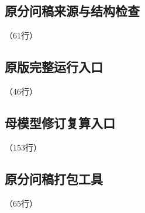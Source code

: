 
\label{code:source:31:end}


\subsection{原分问稿来源与结构检查}

\label{code:source:32}

{\small\noindent{}\quad（61行）\par}


\label{code:source:32:end}


\subsection{原版完整运行入口}

\label{code:source:33}

{\small\noindent{}\quad（46行）\par}


\label{code:source:33:end}


\subsection{母模型修订复算入口}

\label{code:source:34}

{\small\noindent{}\quad（153行）\par}


\label{code:source:34:end}


\subsection{原分问稿打包工具}

\label{code:source:35}

{\small\noindent{}\quad（65行）\par}

